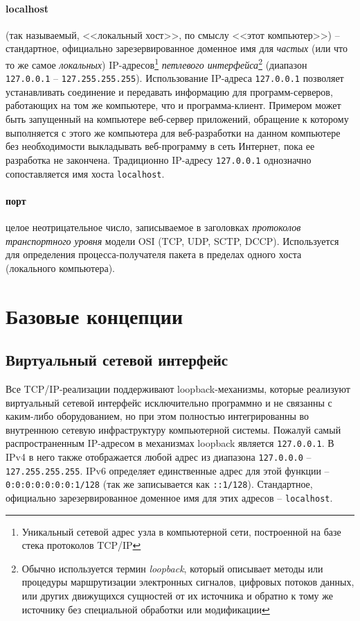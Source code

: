 \documentclass[%
	11pt,
	a4paper,
	utf8,
		]{article}
\begin{document}
\paragraph{{localhost}} (так называемый, <<локальный хост>>, по смыслу <<этот компьютер>>) -- стандартное, официально зарезервированное доменное имя для \emph{частых} (или что то же самое \emph{локальных}) IP-адресов\footnote{Уникальный сетевой адрес узла в компьютерной сети, построенной на базе стека протоколов TCP/IP} \emph{петлевого интерфейса}\footnote{Обычно используется термин \emph{loopback}, который описывает методы или процедуры маршрутизации электронных сигналов, цифровых потоков данных, или других движущихся сущностей от их источника и обратно к тому же источнику без специальной обработки или модификации} (диапазон \texttt{127.0.0.1} -- \texttt{127.255.255.255}). Использование IP-адреса \texttt{127.0.0.1} позволяет устанавливать соединение и передавать информацию для программ-серверов, работающих на том же компьютере, что и программа-клиент. Примером может быть запущенный на компьютере веб-сервер приложений, обращение к которому выполняется с этого же компьютера для веб-разработки на данном компьютере без необходимости выкладывать веб-программу в сеть Интернет, пока ее разработка не закончена. Традиционно IP-адресу \texttt{127.0.0.1} однозначно сопоставляется имя хоста \texttt{localhost}.

\paragraph{{порт}} целое неотрицательное число, записываемое в заголовках \emph{протоколов транспортного уровня} модели OSI (TCP, UDP, SCTP, DCCP). Используется для определения процесса-получателя пакета в пределах одного хоста (локального компьютера).

\section{Базовые концепции}

\subsection{Виртуальный сетевой интерфейс}

Все TCP/IP-реализации поддерживают loopback-механизмы, которые реализуют виртуальный сетевой интерфейс исключительно программно и не связанны с каким-либо оборудованием, но при этом полностью интегрированны во внутреннюю сетевую инфраструктуру компьютерной системы. Пожалуй самый распространенным IP-адресом в механизмах loopback является \texttt{127.0.0.1}. В IPv4 в него также отображается любой адрес из диапазона \texttt{127.0.0.0} -- \texttt{127.255.255.255}. IPv6 определяет единственные адрес для этой функции -- \texttt{0:0:0:0:0:0:0:1/128} (так же записывается как \texttt{::1/128}). Стандартное, официально зарезервированное доменное имя для этих адресов -- \texttt{localhost}.
\end{document}
